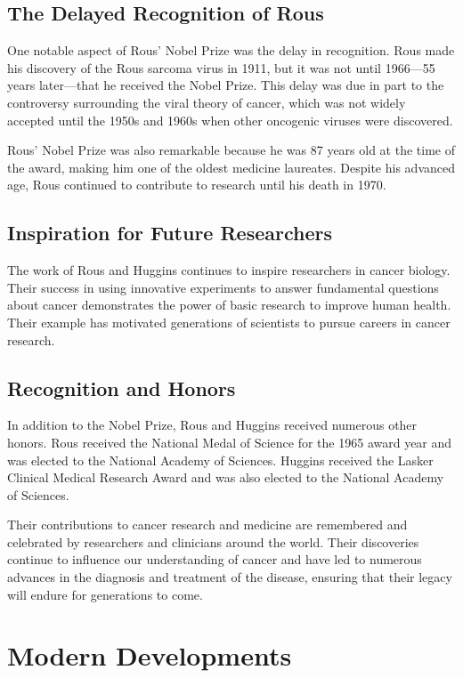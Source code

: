 \subsection{The Delayed Recognition of Rous}

One notable aspect of Rous' Nobel Prize was the delay in recognition. Rous made his discovery of the Rous sarcoma virus in 1911, but it was not until 1966---55 years later---that he received the Nobel Prize. This delay was due in part to the controversy surrounding the viral theory of cancer, which was not widely accepted until the 1950s and 1960s when other oncogenic viruses were discovered.

Rous' Nobel Prize was also remarkable because he was 87 years old at the time of the award, making him one of the oldest medicine laureates. Despite his advanced age, Rous continued to contribute to research until his death in 1970.

\subsection{Inspiration for Future Researchers}

The work of Rous and Huggins continues to inspire researchers in cancer biology. Their success in using innovative experiments to answer fundamental questions about cancer demonstrates the power of basic research to improve human health. Their example has motivated generations of scientists to pursue careers in cancer research.

\subsection{Recognition and Honors}

In addition to the Nobel Prize, Rous and Huggins received numerous other honors. Rous received the National Medal of Science for the 1965 award year and was elected to the National Academy of Sciences. Huggins received the Lasker Clinical Medical Research Award and was also elected to the National Academy of Sciences.

Their contributions to cancer research and medicine are remembered and celebrated by researchers and clinicians around the world. Their discoveries continue to influence our understanding of cancer and have led to numerous advances in the diagnosis and treatment of the disease, ensuring that their legacy will endure for generations to come.


\section{Modern Developments}

